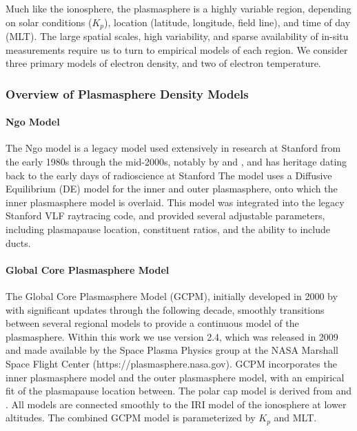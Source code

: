 Much like the ionosphere, the plasmasphere is a highly variable region, depending on solar conditions ($K_p$), location (latitude, longitude, field line), and time of day (MLT). The large spatial scales, high variability, and sparse availability of in-situ measurements require us to turn to empirical models of each region. We consider three primary models of electron density, and two of electron temperature.

\subsubsection{Overview of Plasmasphere Density Models}

\paragraph{Ngo Model}

The Ngo model is a legacy model used extensively in research at Stanford from the early 1980s through the mid-2000s, notably by \cite{Lauben1998} and \cite{Bortnik2005}, and has heritage dating back to the early days of radioscience at Stanford \citep{Kimura1966} The model uses a Diffusive Equilibrium (DE) model for the inner and outer plasmasphere, onto which the \cite{Carpenter1992} inner plasmasphere model is overlaid. This model was integrated into the legacy Stanford VLF raytracing code, and provided several adjustable parameters, including plasmapause location, constituent ratios, and the ability to include ducts.

\paragraph{Global Core Plasmasphere Model}

The Global Core Plasmasphere Model (GCPM), initially developed in 2000 by \cite{Gallagher1999} with significant updates through the following decade, smoothly transitions between several regional models to provide a continuous model of the plasmasphere. Within this work we use version 2.4, which was released in 2009 and made available by the Space Plasma Physics group at the NASA Marshall Space Flight Center (https://plasmasphere.nasa.gov). GCPM incorporates the \cite{Carpenter1992} inner plasmasphere model and the \cite{Gallagher1995} outer plasmasphere model, with an empirical fit of the plasmapause location between. The polar cap model is derived from \cite{Persoon1983} and \cite{Chandler1991}. All models are connected smoothly to the IRI model of the ionosphere at lower altitudes. The combined GCPM model is parameterized by $K_p$ and MLT.

